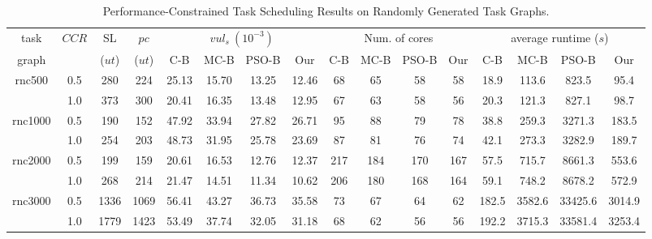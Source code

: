 \documentclass[10pt,journal, compsoc]{IEEEtran}
\begin{document}
\begin{table}[!t]
\renewcommand{\arraystretch}{1.1}
\caption{Performance-Constrained Task Scheduling Results on Randomly Generated Task Graphs.}
\centering
\begin{tabular}{c|c|c|c|cccc|cccc|cccc}
\hline
\hline
task                                     &\multicolumn{1}{c|}{\multirow{2}{*}{$CCR$}}     &SL       &$pc$      &\multicolumn{4}{c|}{$vul_s~(10^{-3})$}        &\multicolumn{4}{c|}{Num. of cores}    &\multicolumn{4}{c}{average runtime ($s$)}    \\ \cline{5-8} \cline{9-12} \cline{13-16}
graph                                    &                                                &($ut$)   &($ut$)    &C-B    &MC-B  &PSO-B   &Our   &C-B       &MC-B  &PSO-B  &Our    &C-B       &MC-B  &PSO-B  &Our  \\

\hline
\hline
\multicolumn{1}{c|}{\multirow{2}{*}{rnc500}}      &0.5 &280 &224  &25.13       &15.70  &13.25  &12.46    &68    &65  &58  &58    &18.9     &113.6  &823.5  &95.4               \\
                                                  &1.0  &373  &300   &20.41    &16.35  &13.48  &12.95    &67    &63  &58  &56    &20.3     &121.3  &827.1  &98.7               \\
\hline
\multicolumn{1}{c|}{\multirow{2}{*}{rnc1000}}     &0.5 &190 &152  &47.92    &33.94   &27.82  &26.71    &95    &88  &79  &78    &38.8     &259.3  &3271.3  &183.5             \\
                                                  &1.0 &254  &203  &48.73    &31.95  &25.78  &23.69    &87    &81  &76  &74    &42.1     &273.3 &3282.9   &189.7              \\

\hline
\multicolumn{1}{c|}{\multirow{2}{*}{rnc2000}}     &0.5 &199  &159  &20.61    &16.53  &12.76  &12.37    &217    &184  &170  &167    &57.5     &715.7  &8661.3  &553.6             \\
                                                  &1.0 &268  &214  &21.47    &14.51  &11.34  &10.62    &206    &180  &168  &164    &59.1     &748.2  &8678.2  &572.9            \\

\hline
\multicolumn{1}{c|}{\multirow{2}{*}{rnc3000}}     &0.5 &1336  &1069  &56.41    &43.27  &36.73  &35.58    &73    &67  &64  &62    &182.5     &3582.6  &33425.6  &3014.9             \\
                                                  &1.0 &1779  &1423  &53.49    &37.74  &32.05  &31.18    &68    &62  &56  &56    &192.2     &3715.3  &33581.4  &3253.4            \\
\hline


\end{tabular}
\end{table}
\end{document}
